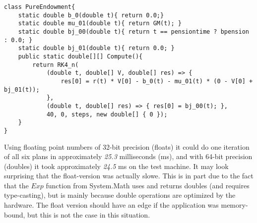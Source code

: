 \begin{lstlisting}[caption=The pure endowment insurance plan expressed in C\#, label=csharp_pureendowment]
class PureEndowment{
    static double b_0(double t){ return 0.0;}
    static double mu_01(double t){ return GM(t); }
    static double bj_00(double t){ return t == pensiontime ? bpension : 0.0; }
    static double bj_01(double t){ return 0.0; }
    public static double[][] Compute(){
        return RK4_n(
            (double t, double[] V, double[] res) => { 
                res[0] = r(t) * V[0] - b_0(t) - mu_01(t) * (0 - V[0] + bj_01(t)); 
            },
            (double t, double[] res) => { res[0] = bj_00(t); },
            40, 0, steps, new double[] { 0 });
    }
}
\end{lstlisting}

Using floating point numbers of 32-bit precision (floats) it could do one iteration of all six plans in approximately \emph{25.3} milliseconds (ms), and with 64-bit precision (doubles) it took approximately \emph{24.5} ms on the test machine.
It may look surprising that the float-version was actually slowe.
This is in part due to the fact that the $Exp$ function from System.Math uses and returns doubles (and requires type-casting), but is mainly because double operations are optimized by the hardware\cite{northrup2008mcts}.
The float version should have an edge if the application was memory-bound, but this is not the case in this situation.